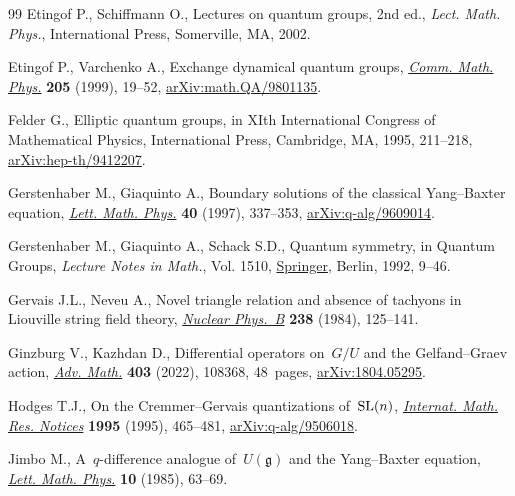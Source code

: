 \documentclass[pdftex]{sigma}
\numberwithin{equation}{section}
\begin{document}
\begin{thebibliography}{99}
Etingof P., Schiffmann O., Lectures on quantum groups, 2nd ed., \textit{Lect. Math. Phys.}, International Press, Somerville, MA, 2002.

Etingof P., Varchenko A., Exchange dynamical quantum groups, \href{https://doi.org/10.1007/s002200050665}{\textit{Comm.
 Math. Phys.}} \textbf{205} (1999), 19--52, \href{https://arxiv.org/abs/math.QA/9801135}{arXiv:math.QA/9801135}.

Felder G., Elliptic quantum groups, in X{I}th {I}nternational {C}ongress of
 {M}athematical {P}hysics, International Press, Cambridge, MA, 1995, 211--218,
 \href{https://arxiv.org/abs/hep-th/9412207}{arXiv:hep-th/9412207}.

Gerstenhaber M., Giaquinto A., Boundary solutions of the classical
 {Y}ang--{B}axter equation, \href{https://doi.org/10.1023/A:1007363911649}{\textit{Lett. Math. Phys.}} \textbf{40} (1997),
 337--353, \href{https://arxiv.org/abs/q-alg/9609014}{arXiv:q-alg/9609014}.

Gerstenhaber M., Giaquinto A., Schack S.D., Quantum symmetry, in Quantum
 {G}roups, \textit{Lecture Notes in Math.}, Vol. 1510, \href{https://doi.org/10.1007/BFb0101176}{Springer}, Berlin, 1992,
 9--46.

Gervais J.L., Neveu A., Novel triangle relation and absence of tachyons in
 {L}iouville string field theory, \href{https://doi.org/10.1016/0550-3213(84)90469-3}{\textit{Nuclear Phys.~B}} \textbf{238}
 (1984), 125--141.

Ginzburg V., Kazhdan D., Differential operators on~{$G/U$} and the
 {G}elfand--{G}raev action, \href{https://doi.org/10.1016/j.aim.2022.108368}{\textit{Adv. Math.}} \textbf{403} (2022), 108368,
 48~pages, \href{https://arxiv.org/abs/1804.05295}{arXiv:1804.05295}.

Hodges T.J., On the {C}remmer--{G}ervais quantizations of~{${\rm SL}(n)$},
  \href{https://doi.org/10.1155/S107379289500033X}{\textit{Internat. Math. Res. Notices}} \textbf{1995} (1995), 465--481,
 \href{https://arxiv.org/abs/q-alg/9506018}{arXiv:q-alg/9506018}.

Jimbo M., A~{$q$}-difference analogue of~{$U({\mathfrak{g}})$} and the
 {Y}ang--{B}axter equation, \href{https://doi.org/10.1007/BF00704588}{\textit{Lett. Math. Phys.}} \textbf{10} (1985),
 63--69.


\end{thebibliography}
\end{document}

